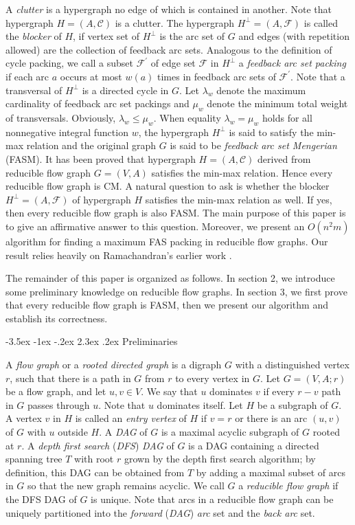 \documentclass[11pt]{article}
\makeatletter
\renewcommand\section{%
  \@startsection{section}{1}
                {\z@}%
                {-3.5ex \@plus -1ex \@minus -.2ex}%
                {2.3ex \@plus.2ex}%
                {\large\bfseries}%
}
\makeatother
\begin{document}
A \emph{clutter} is a hypergraph no edge of which is contained in another. Note that hypergraph $H=(A,\mathcal{C})$ is a clutter. The hypergraph $H^\perp=(A,\mathcal{F})$ is called the \emph{blocker} of $H$, if vertex set of $H^\perp$ is the arc set of $G$ and edges (with repetition allowed) are the collection of feedback arc sets. Analogous to the definition of cycle packing, we call a subset $\mathcal{F}^\prime$ of edge set $\mathcal{F}$ in $H^\perp$ a \emph{feedback arc set packing} if each arc $a$ occurs at most $w(a)$ times in feedback arc sets of $\mathcal{F}^\prime$. Note that a transversal of $H^\perp$ is a directed cycle in $G$. Let $\lambda_w$ denote the maximum cardinality of feedback arc set packings and $\mu_w$ denote the minimum total weight of transversals. Obviously, $\lambda_w\leq\mu_w$. When equality $\lambda_w=\mu_w$ holds for all nonnegative integral function $w$, the hypergraph $H^\perp$ is said to satisfy the min-max relation and the original graph $G$ is said to be \emph{feedback arc set Mengerian} (FASM). It has been proved that hypergraph $H=(A,\mathcal{C})$ derived from reducible flow graph $G=(V,A)$ satisfies the min-max relation. Hence every reducible flow graph is CM. A natural question to ask is whether the blocker $H^\perp=(A,\mathcal{F})$ of hypergraph $H$ satisfies the min-max relation as well. If yes, then every reducible flow graph is also FASM. The main purpose of this paper is to give an affirmative answer to this question. Moreover, we present an $O(n^2 m)$ algorithm for finding a maximum FAS packing in reducible flow graphs. Our result relies heavily on Ramachandran's earlier work \cite{Rama1,Rama2}.

The remainder of this paper is organized as follows. In section 2, we introduce some preliminary knowledge on reducible flow graphs. In section 3, we first prove that every reducible flow graph is FASM, then we present our algorithm and establish its correctness.

\section{Preliminaries}
\label{prel}

A \emph{flow graph} or a \emph{rooted directed graph} is a digraph $G$ with a distinguished vertex $r$, such that there is a path in $G$ from $r$ to every vertex in $G$. Let $G=(V,A;r)$ be a flow graph, and let $u,v\in V$. We say that $u$ dominates $v$ if every $r-v$ path in $G$ passes through $u$. Note that $u$ dominates itself. Let $H$ be a subgraph of $G$. A vertex $v$ in $H$ is called an \emph{entry vertex} of $H$ if $v=r$ or there is an arc $(u,v)$ of $G$ with $u$ outside $H$. A \emph{DAG} of $G$ is a maximal acyclic subgraph of $G$ rooted at $r$. A \emph{depth first search} (\emph{DFS}) \emph{DAG} of $G$ is a DAG containing a directed spanning tree $T$ with root $r$ grown by the depth first search algorithm; by definition, this DAG can be obtained from $T$ by adding a maximal subset of arcs in $G$ so that the new graph remains acyclic. We call $G$ a \emph{reducible flow graph} if the DFS DAG of $G$ is unique. Note that arcs in a reducible flow graph can be uniquely partitioned into the \emph{forward} (\emph{DAG}) \emph{arc} set and the \emph{back arc} set.
\end{document}
